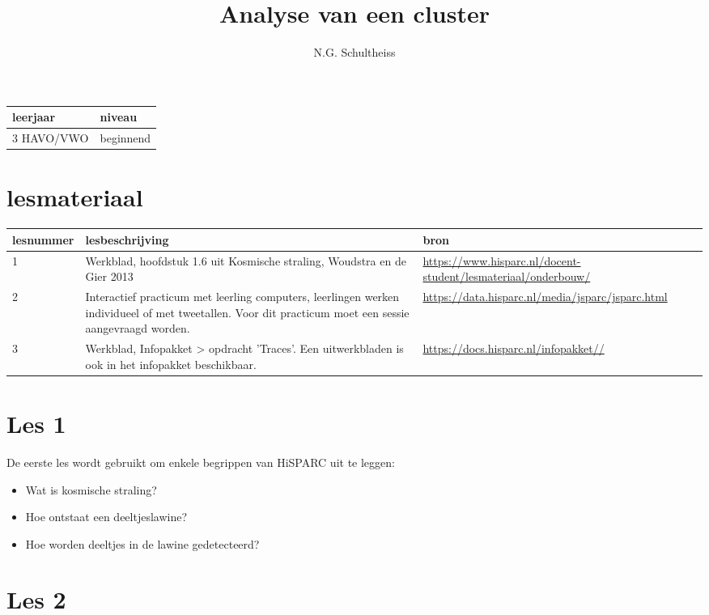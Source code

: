 

\title{Analyse van een cluster}
\author{N.G. Schultheiss}



\maketitle

\begin{tabular}{|>{\raggedright}p{3cm}|>{\raggedright}p{12cm}|}
\hline
leerjaar & niveau \tabularnewline
\hline
3 HAVO/VWO & beginnend \tabularnewline
\hline
\end{tabular}

\section{lesmateriaal}

\begin{tabular}{ |>{\raggedright}p{2.5cm}|>{\raggedright}p{8cm}|>{\raggedright}p{4cm}|}
\hline
lesnummer & lesbeschrijving & bron \tabularnewline
\hline
1 &
Werkblad, hoofdstuk 1.6 uit Kosmische straling, Woudstra en de Gier 2013 &
\url{https://www.hisparc.nl/docent-student/lesmateriaal/onderbouw/} \tabularnewline
\hline
2 &
Interactief practicum met leerling computers, leerlingen werken individueel of met tweetallen. Voor dit practicum moet een sessie aangevraagd worden. &
\url{https://data.hisparc.nl/media/jsparc/jsparc.html} \tabularnewline
\hline
3 &
Werkblad, Infopakket > opdracht 'Traces'. Een uitwerkbladen is ook in het infopakket beschikbaar. &
\url{https://docs.hisparc.nl/infopakket//} \tabularnewline
\hline
\end{tabular}

\section{Les 1}

De eerste les wordt gebruikt om enkele begrippen van HiSPARC uit te leggen:

\begin{itemize}
\item Wat is kosmische straling?
\item Hoe ontstaat een deeltjeslawine?
\item Hoe worden deeltjes in de lawine gedetecteerd?
\end{itemize}

\section{Les 2}

